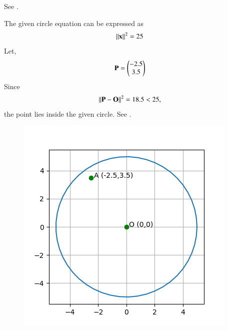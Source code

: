 See 
.
\begin{table}[!h]
\begin{center}

\end{center}
\caption{}
\label{tab:chapters/11/11/1/15/}
\end{table}
The given circle equation can be expressed as
\begin{align}
	\left\lVert\mathbf{x}\right\rVert^2= 25
\end{align}
Let,
\begin{align}
	\mathbf{P}=\begin{pmatrix}-2.5\\3.5\end{pmatrix}
\end{align}
Since
\begin{align}
	\left\lVert\mathbf{P} - \mathbf{O}\right\rVert^2 =
 18.5 < 25,
\end{align}
the point lies inside the given circle.
See 
    .
\begin{figure}[h!]
  \centering
    \includegraphics[width=\columnwidth]{chapters/11/11/1/15/figs/Figure_1.png}
    \caption{}
    \label{fig:chapters/11/11/1/15/}
\end{figure}
